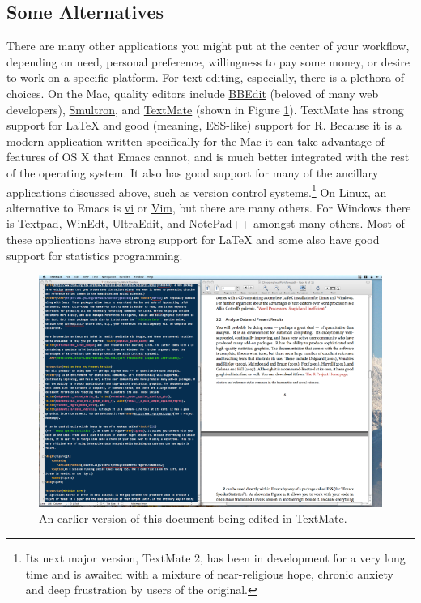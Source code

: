 \documentclass[11pt,article,oneside]{memoir}
\begin{document}
\subsection*{Some Alternatives}
\label{sec-8_2}

There are many other applications you might put at the center of your
workflow, depending on need, personal preference, willingness to pay
some money, or desire to work on a specific platform. For text
editing, especially, there is a plethora of choices. On the Mac,
quality editors include
\href{http://www.barebones.com/products/bbedit/index.shtml}{BBEdit}
(beloved of many web developers),
\href{http://smultron.sourceforge.net/}{Smultron}, and
\href{http://macromates.com/}{TextMate} (shown in Figure
\ref{fig:tm}). TextMate has strong support for \LaTeX{} and good
(meaning, ESS-like) support for R. Because it is a modern application
written specifically for the Mac it can take advantage of features of
OS X that Emacs cannot, and is much better integrated with the rest of
the operating system. It also has good support for many of the
ancillary applications discussed above, such as version control
systems.\footnote{Its next major version, TextMate 2, has been in
  development for a very long time and is awaited with a mixture of
  near-religious hope, chronic anxiety and deep frustration by users
  of the original. } On Linux, an alternative to Emacs is
\href{http://www.eng.hawaii.edu/Tutor/vi.html}{vi} or
\href{http://www.vim.org/}{Vim}, but there are many others. For
Windows there is \href{http://www.textpad.com/}{Textpad},
\href{http://www.winedt.com/}{WinEdt},
\href{http://www.ultraedit.com/}{UltraEdit}, and
\href{http://notepad-plus.sourceforge.net/uk/site.htm}{NotePad++}
amongst many others. Most of these applications have strong support
for \LaTeX{} and some also have good support for statistics
programming.

\begin{figure}[htb]
\centering
\includegraphics[width=5in]{figures/textmate.png}
\caption{\label{fig:tm}An earlier version of this document being edited in TextMate.}
\end{figure}
\end{document}
